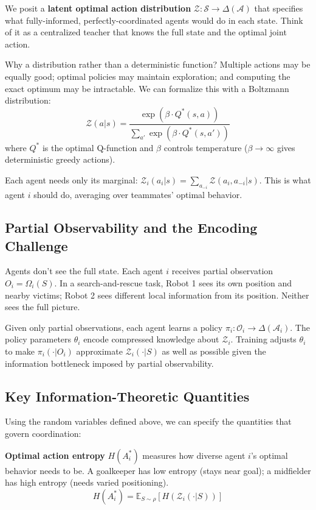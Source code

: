 \documentclass[10pt, letterpaper]{article}
\begin{document}
We posit a \textbf{latent optimal action distribution} $\mathcal{Z}: \mathcal{S} \to \Delta(\mathcal{A})$ that specifies what fully-informed, perfectly-coordinated agents would do in each state. Think of it as a centralized teacher that knows the full state and the optimal joint action.

Why a distribution rather than a deterministic function? Multiple actions may be equally good; optimal policies may maintain exploration; and computing the exact optimum may be intractable. We can formalize this with a Boltzmann distribution:
\[\mathcal{Z}(a|s) = \frac{\exp(\beta \cdot Q^*(s,a))}{\sum_{a'} \exp(\beta \cdot Q^*(s,a'))}\]
where $Q^*$ is the optimal Q-function and $\beta$ controls temperature ($\beta \to \infty$ gives deterministic greedy actions).

Each agent needs only its marginal: $\mathcal{Z}_i(a_i|s) = \sum_{a_{-i}} \mathcal{Z}(a_i, a_{-i}|s)$. This is what agent $i$ should do, averaging over teammates' optimal behavior.

\subsection{Partial Observability and the Encoding Challenge}

Agents don't see the full state. Each agent $i$ receives partial observation $O_i = \Omega_i(S)$. In a search-and-rescue task, Robot 1 sees its own position and nearby victims; Robot 2 sees different local information from its position. Neither sees the full picture.

Given only partial observations, each agent learns a policy $\pi_i: \mathcal{O}_i \to \Delta(\mathcal{A}_i)$. The policy parameters $\theta_i$ encode compressed knowledge about $\mathcal{Z}_i$. Training adjusts $\theta_i$ to make $\pi_i(\cdot|O_i)$ approximate $\mathcal{Z}_i(\cdot|S)$ as well as possible given the information bottleneck imposed by partial observability.

\subsection{Key Information-Theoretic Quantities}

Using the random variables defined above, we can specify the quantities that govern coordination:

\textbf{Optimal action entropy} $H(A_i^*)$ measures how diverse agent $i$'s optimal behavior needs to be. A goalkeeper has low entropy (stays near goal); a midfielder has high entropy (needs varied positioning).
\[H(A_i^*) = \mathbb{E}_{S \sim \rho} \left[ H(\mathcal{Z}_i(\cdot|S)) \right]\]
\end{document}
